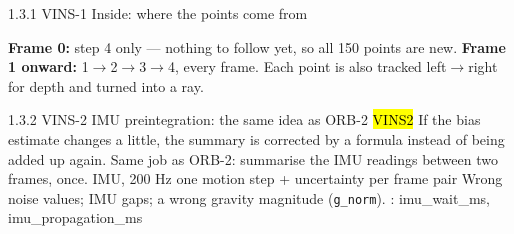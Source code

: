 \begin{frame}{1.3.1 \;VINS-1 \;Inside: where the points come from}
  \par\vspace{0.15em}
  \scriptsize\color{black!70}
  \textbf{Frame 0:} step 4 only --- nothing to follow yet, so all 150 points are new.
  \textbf{Frame 1 onward:} 1$\rightarrow$2$\rightarrow$3$\rightarrow$4, every frame.
  Each point is also tracked left$\rightarrow$right for depth and turned into a ray.
\end{frame}

\begin{frame}{1.3.2 \;VINS-2 \;IMU preintegration: the same idea as ORB-2}
  \hl{VINS2}
  {If the bias estimate changes a little, the summary is corrected by a formula
   instead of being added up again.}
  {Same job as ORB-2: summarise the IMU readings between two frames, once.}
  {IMU, 200 Hz}
  {one motion step + uncertainty per frame pair}
  {Wrong noise values; IMU gaps; a wrong gravity magnitude (\texttt{g\_norm}).}
  {: imu\_wait\_ms, imu\_propagation\_ms}
\end{frame}

